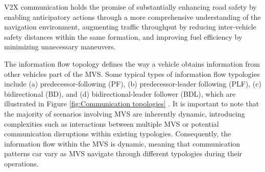 V2X communication holds the promise of substantially enhancing road safety by enabling anticipatory actions through a more comprehensive understanding of the navigation environment, augmenting traffic throughput by reducing inter-vehicle safety distances within the same formation, and improving fuel efficiency by minimizing unnecessary maneuvers. 


The information flow topology defines the way a vehicle obtains information from other vehicles part of the MVS. Some typical types of information flow typologies include (a) predecessor-following (PF), (b) predecessor-leader following (PLF), (c) bidirectional (BD), and (d) bidirectional-leader follower (BDL), which are illustrated in Figure \ref{fig:Communication topologies} \cite{zheng2014influence}\cite{wang2018review}. It is important to note that the majority of scenarios involving MVS are inherently dynamic, introducing complexities such as interactions between multiple MVS or potential communication disruptions within existing typologies. Consequently, the information flow within the MVS is dynamic, meaning that communication patterns car vary as MVS navigate through different typologies during their operations. 

